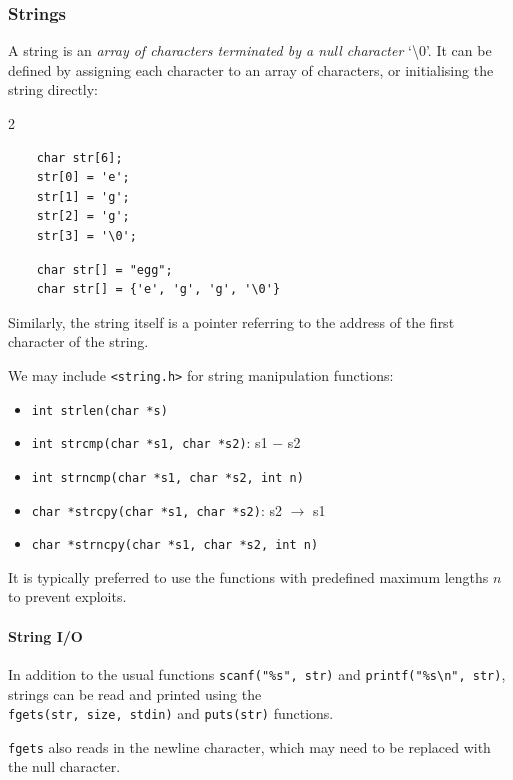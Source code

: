 \subsubsection{Strings}
A string is an \textit{array of characters terminated by a null character}
`\textbackslash0'. It can be defined by assigning each character to an array of
characters, or initialising the string directly:
\begin{multicols}{2}
  \begin{lstlisting}
    char str[6];
    str[0] = 'e';
    str[1] = 'g';
    str[2] = 'g';
    str[3] = '\0';
  \end{lstlisting}
  \begin{lstlisting}
    char str[] = "egg";
    char str[] = {'e', 'g', 'g', '\0'}
  \end{lstlisting}
  \vfill\null
\end{multicols}
Similarly, the string itself is a pointer referring to the address of the first
character of the string.

\begin{remark}
  We may include \verb|<string.h>| for string manipulation functions:
    \begin{itemize}
      \item \verb|int strlen(char *s)|
      \item \verb|int strcmp(char *s1, char *s2)|: s1 $-$ s2
      \item \verb|int strncmp(char *s1, char *s2, int n)|
      \item \verb|char *strcpy(char *s1, char *s2)|: s2 $\to$ s1
      \item \verb|char *strncpy(char *s1, char *s2, int n)|
    \end{itemize}
  It is typically preferred to use the functions with predefined maximum
  lengths $n$ to prevent exploits.
\end{remark}

\paragraph{String I/O}
In addition to the usual functions \verb|scanf("%s", str)| and
\verb|printf("%s\n", str)|,
strings can be read and printed using the\\
\centering
\verb|fgets(str, size, stdin)| and \verb|puts(str)| functions.\\
\raggedright
\begin{remark}
  \verb|fgets| also reads in the newline character, which may need to be
  replaced with the null character.
\end{remark}

